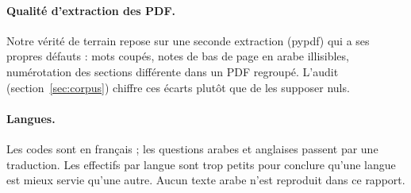 \paragraph{Qualité d'extraction des PDF.} Notre vérité de terrain repose sur une seconde extraction (pypdf) qui a ses propres
défauts : mots coupés, notes de bas de page en arabe illisibles, numérotation des sections différente dans un PDF regroupé.
L'audit (section~\ref{sec:corpus}) chiffre ces écarts plutôt que de les supposer nuls.

\paragraph{Langues.} Les codes sont en français ; les questions arabes et anglaises passent par une traduction. Les effectifs
par langue sont trop petits pour conclure qu'une langue est mieux servie qu'une autre. Aucun texte arabe n'est reproduit
dans ce rapport.
